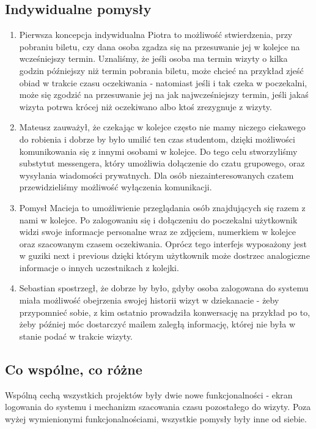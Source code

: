 \documentclass[12pt]{article}
\begin{document}
\subsection {Indywidualne pomysły}
\begin {enumerate}
	\item Pierwsza koncepcja indywidualna Piotra to możliwość stwierdzenia, przy pobraniu biletu, czy dana osoba zgadza się na przesuwanie jej w kolejce na wcześniejszy termin. Uznaliśmy, że jeśli osoba ma termin wizyty o kilka godzin późniejszy niż termin pobrania biletu, może chcieć na przykład zjeść obiad w trakcie czasu oczekiwania - natomiast jeśli i tak czeka w poczekalni, może się zgodzić na przesuwanie jej na jak najwcześniejszy termin, jeśli jakaś wizyta potrwa krócej niż oczekiwano albo ktoś zrezygnuje z wizyty.
	
	\item Mateusz zauważył, że czekając w kolejce często nie mamy niczego ciekawego do robienia i dobrze by było umilić ten czas studentom, dzięki możliwości komunikowania się z innymi osobami w kolejce. Do tego celu stworzyliśmy substytut messengera, który umożliwia dołączenie do czatu grupowego, oraz wysyłania wiadomości prywatnych. Dla osób niezainteresowanych czatem przewidzieliśmy możliwość wyłączenia komunikacji.
	
	\item Pomysł Macieja to umożliwienie przeglądania osób znajdujących się razem z nami w kolejce. Po zalogowaniu się i dołączeniu do poczekalni użytkownik widzi swoje informacje personalne wraz ze zdjęciem, numerkiem w kolejce oraz szacowanym czasem oczekiwania. Oprócz tego interfejs wyposażony jest w guziki next i previous dzięki którym użytkownik może dostrzec analogiczne informacje o innych uczestnikach z kolejki.
	
	\item Sebastian spostrzegł, że dobrze by było, gdyby osoba zalogowana do systemu miała możliwość obejrzenia swojej historii wizyt w dziekanacie - żeby przypomnieć sobie, z kim ostatnio prowadziła konwersację na przykład po to, żeby później móc dostarczyć mailem zaległą informację, której nie była w stanie podać w trakcie wizyty.

\end {enumerate}

\subsection {Co wspólne, co różne}
Wspólną cechą wszystkich projektów były dwie nowe funkcjonalności - ekran logowania do systemu i mechanizm szacowania czasu pozostałego do wizyty. Poza wyżej wymienionymi funkcjonalnościami, wszystkie pomysły były inne od siebie. 
\end{document}
